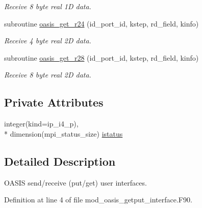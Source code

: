 \begin{DoxyCompactItemize}
\begin{DoxyCompactList}\small\item\em Receive 8 byte real 1\+D data. \end{DoxyCompactList}\item 
subroutine \hyperlink{classmod__oasis__getput__interface_adb63a11f1dc98b61159747ce37af7a86}{oasis\+\_\+get\+\_\+r24} (id\+\_\+port\+\_\+id, kstep, rd\+\_\+field, kinfo)
\begin{DoxyCompactList}\small\item\em Receive 4 byte real 2\+D data. \end{DoxyCompactList}\item 
subroutine \hyperlink{classmod__oasis__getput__interface_a7178554f023eb62092fb03e2edf55eb6}{oasis\+\_\+get\+\_\+r28} (id\+\_\+port\+\_\+id, kstep, rd\+\_\+field, kinfo)
\begin{DoxyCompactList}\small\item\em Receive 8 byte real 2\+D data. \end{DoxyCompactList}\end{DoxyCompactItemize}
\subsection*{Private Attributes}
\begin{DoxyCompactItemize}
\item 
integer(kind=ip\+\_\+i4\+\_\+p), \\*
dimension(mpi\+\_\+status\+\_\+size) \hyperlink{classmod__oasis__getput__interface_a2ceaaa5740216799f651b8dacb42b239}{istatus}
\end{DoxyCompactItemize}


\subsection{Detailed Description}
O\+A\+S\+I\+S send/receive (put/get) user interfaces. 

Definition at line 4 of file mod\+\_\+oasis\+\_\+getput\+\_\+interface.\+F90.



